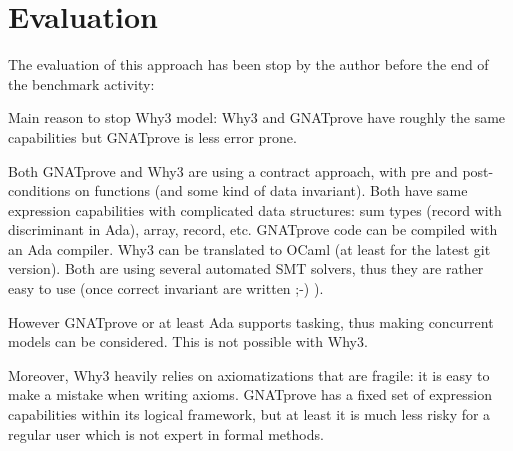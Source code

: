 \section{Evaluation}

The evaluation of this approach has been stop by the author before the end of the benchmark activity:


\begin{author_comment}

Main reason to stop Why3 model: Why3 and GNATprove have roughly the same capabilities but GNATprove is less error prone.

Both GNATprove and Why3 are using a contract approach, with pre and post-conditions on functions (and some kind of data invariant). Both have same expression capabilities with complicated data structures: sum types (record with discriminant in Ada), array, record, etc. GNATprove code can be compiled with an Ada compiler. Why3 can be translated to OCaml (at least for the latest git version). Both are using several automated SMT solvers, thus they are rather easy to use (once correct invariant are written ;-) ).

However GNATprove or at least Ada supports tasking, thus making concurrent models can be considered. This is not possible with Why3.

Moreover, Why3 heavily relies on axiomatizations that are fragile: it is easy to make a mistake when writing axioms. GNATprove has a fixed set of expression capabilities within its logical framework, but at least it is much less risky for a regular user which is not expert in formal methods.

\end{author_comment}



